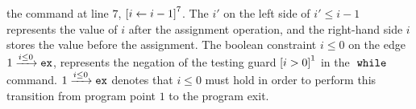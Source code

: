  the command at line $7$, 
$\clabel{\assign{i}{i - 1}}^{7}$. 
The $i'$ on the left side of $i' \leq i - 1$ represents the value of $i$ after the assignment operation,
and the right-hand side $i$ stores the value before the assignment.
The boolean constraint $i \leq 0 $ on the edge $1 \xrightarrow{i \leq 0} \mathtt{ex}$, 
represents the negation of the testing guard $\clabel{i > 0}^1$
in the $\;\mathtt{while}\;$ command.
$1 \xrightarrow{i \leq 0} \mathtt{ex}$ denotes that $i \leq 0$ must hold in order to perform this transition from program point $1$ to
the program exit. 

